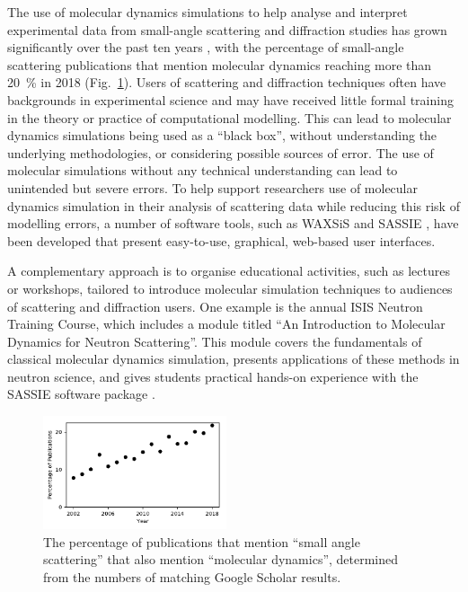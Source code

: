\documentclass[amsmath,amssymb,twocolumn,superscriptaddress]{revtex4-1}
\begin{document}
\noindent The use of molecular dynamics simulations to help analyse and interpret experimental data from small-angle scattering and diffraction studies has grown significantly over the past ten years \cite{pan_molecular_2012,boldon_review_2015,hub_interpreting_2018,ivanovic_temperature-dependent_2018,east_structural_2016,wall_conformational_2014,wall_internal_2018,satoh_multiple_2015}, with the percentage of small-angle scattering publications that mention molecular dynamics reaching more than \SI{20}{\percent} in 2018 (Fig.~\ref{fig:growth}).
Users of scattering and diffraction techniques often have backgrounds in experimental science and may have received little formal training in the theory or practice of computational modelling.
This can lead to molecular dynamics simulations being used as a ``black box'', without understanding the underlying methodologies, or considering possible sources of error.
The use of molecular simulations without any technical understanding can lead to unintended but severe errors.
To help support researchers use of molecular dynamics simulation in their analysis of scattering data while reducing this risk of modelling errors, a number of software tools, such as WAXSiS and SASSIE \cite{chen_validating_2014,knight_waxsis_2015,perkins_atomistic_2016}, have been developed that present easy-to-use, graphical, web-based user interfaces.

A complementary approach is to organise educational activities, such as lectures or workshops, tailored to introduce molecular simulation techniques to audiences of scattering and diffraction users.
One example is the annual ISIS Neutron Training Course, which includes a module titled ``An Introduction to Molecular Dynamics for Neutron Scattering''.
This module covers the fundamentals of classical molecular dynamics simulation, presents applications of these methods in neutron science, and gives students practical hands-on experience with the SASSIE software package \cite{perkins_atomistic_2016}.

%
\begin{figure}
\label{fig:growth}
\includegraphics[width=0.48\textwidth]{figures/chem_data_py.pdf}
\caption{The percentage of publications that mention ``small angle scattering'' that also mention ``molecular dynamics'', determined from the numbers of matching Google Scholar results.}
\end{figure}
%
\end{document}
